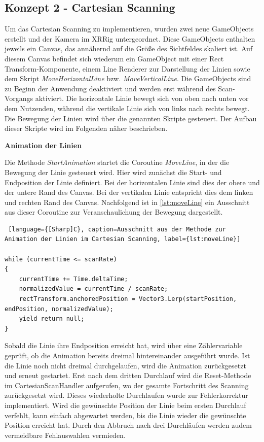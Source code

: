 \subsection{Konzept 2 - Cartesian Scanning}

Um das Cartesian Scanning zu implementieren, wurden zwei neue GameObjects erstellt und der Kamera im XRRig untergeordnet. Diese GameObjects enthalten jeweils ein Canvas, das annähernd auf die Größe des Sichtfeldes skaliert ist. Auf diesem Canvas befindet sich wiederum ein GameObject mit einer Rect Transform-Komponente, einem Line Renderer zur Darstellung der Linien sowie dem Skript \textit{MoveHorizontalLine} bzw. \textit{MoveVerticalLine}. Die GameObjects sind zu Beginn der Anwendung deaktiviert und werden erst während des Scan-Vorgangs aktiviert.
Die horizontale Linie bewegt sich von oben nach unten vor dem Nutzenden, während die vertikale Linie sich von links nach rechts bewegt. Die Bewegung der Linien wird über die genannten Skripte gesteuert. Der Aufbau dieser Skripte wird im Folgenden näher beschrieben. 

\textbf{Animation der Linien}

Die Methode \textit{StartAnimation} startet die Coroutine \textit{MoveLine}, in der die Bewegung der Linie gesteuert wird. Hier wird zunächst die Start- und Endposition der Linie definiert. Bei der horizontalen Linie sind dies der obere und der untere Rand des Canvas. Bei der vertikalen Linie entspricht dies dem linken und rechten Rand des Canvas. Nachfolgend ist in \autoref{lst:moveLine} ein Ausschnitt aus dieser Coroutine zur Veranschaulichung der Bewegung dargestellt. 

\begin{lstlisting} [language={[Sharp]C}, caption=Ausschnitt aus der Methode zur Animation der Linien im Cartesian Scanning, label={lst:moveLine}]

while (currentTime <= scanRate)
{
    currentTime += Time.deltaTime;
    normalizedValue = currentTime / scanRate;
    rectTransform.anchoredPosition = Vector3.Lerp(startPosition, endPosition, normalizedValue);
    yield return null;
}
\end{lstlisting}

Sobald die Linie ihre Endposition erreicht hat, wird über eine Zählervariable geprüft, ob die Animation bereits dreimal hintereinander ausgeführt wurde. Ist die Linie noch nicht dreimal durchgelaufen, wird die Animation zurückgesetzt und erneut gestartet. Erst nach dem dritten Durchlauf wird die Reset-Methode im CartesianScanHandler aufgerufen, wo der gesamte Fortschritt des Scanning zurückgesetzt wird. Dieses wiederholte Durchlaufen wurde zur Fehlerkorrektur implementiert. Wird die gewünschte Position der Linie beim ersten Durchlauf verfehlt, kann einfach abgewartet werden, bis die Linie wieder die gewünschte Position erreicht hat. Durch den Abbruch nach drei Durchläufen werden zudem vermeidbare Fehlauswahlen vermieden.


